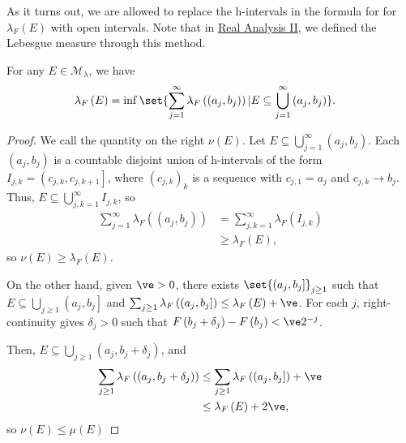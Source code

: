\documentclass[10pt]{mypackage}
\begin{document}
As it turns out, we are allowed to replace the h-intervals in the formula for for $\lambda_F(E)$ with open intervals. Note that in \href{https://ai.avinash-iyer.com/Classes_and_Homework/College/Y3/Y3S2,\%20Real\%20II/real_2_notes.pdf}{Real Analysis II}, we defined the Lebesgue measure through this method.
\begin{lemma}
  For any $E\in \mathcal{M}_{\lambda}$, we have
  \begin{align*}
    \lambda_F\left( E \right) &= \inf\set{\sum_{j=1}^{\infty}\lambda_F\left( \left( a_j,b_j \right) \right) | E\subseteq \bigcup_{j=1}^{\infty}\left( a_j,b_j \right)}.
  \end{align*}
\end{lemma}
\begin{proof}
  We call the quantity on the right $\nu\left( E \right)$. Let $E\subseteq \bigcup_{j=1}^{\infty}\left( a_j,b_j \right)$. Each $\left( a_j,b_j \right)$ is a countable disjoint union of h-intervals of the form $I_{j,k} = \left( c_{j,k},c_{j,k+1} \right]$, where $\left( c_{j,k} \right)_k$ is a sequence with $c_{j,1} = a_j$ and $c_{j,k}\rightarrow b_j$. Thus, $E\subseteq \bigcup_{j,k=1}^{\infty}I_{j,k}$, so
  \begin{align*}
    \sum_{j=1}^{\infty}\lambda_F\left( \left( a_j,b_j \right) \right) &= \sum_{j,k=1}^{\infty}\lambda_F\left( I_{j,k} \right)\\
                                                                &\geq \lambda_F\left( E \right),
  \end{align*}
  so $\nu\left( E \right)\geq \lambda_F\left( E \right)$.\newline

  On the other hand, given $\ve > 0$, there exists $\set{\left( a_j,b_j \right]}_{j\geq 1}$ such that $E\subseteq \bigcup_{j\geq 1}\left( a_j,b_j \right]$ and $\sum_{j\geq 1}\lambda_F\left( \left( a_j,b_j \right] \right) \leq \lambda_F\left( E \right) + \ve$. For each $j$, right-continuity gives $\delta_j > 0$ such that $F\left( b_j + \delta_j \right) - F\left( b_j \right) < \ve 2^{-j}$.\newline

  Then, $E\subseteq \bigcup_{j\geq 1}\left( a_j,b_j + \delta_j \right)$, and
  \begin{align*}
    \sum_{j\geq 1} \lambda_F\left( \left( a_j,b_j + \delta_j \right) \right) &\leq \sum_{j\geq 1}\lambda_F\left( \left( a_j,b_j \right] \right) + \ve\\
                                                                       &\leq \lambda_F\left( E \right) + 2\ve,
  \end{align*}
  so $\nu\left( E \right) \leq \mu\left( E \right)$
\end{proof}
\end{document}
